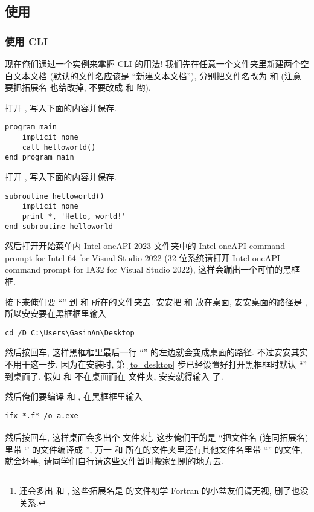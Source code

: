 \subsection{使用}\label{use_ifx}

\subsubsection{使用 CLI}

现在俺们通过一个实例来掌握 CLI 的用法! 我们先在任意一个文件夹里新建两个空白文本文档 (默认的文件名应该是 ``\textsf{新建}\ttt{\ }\textsf{文本文档}''), 分别把文件名改为  和  (注意要把拓展名  也给改掉, 不要改成  和  哟).

打开 , 写入下面的内容并保存.
\begin{lstlisting}
program main
    implicit none
    call helloworld()
end program main
\end{lstlisting}

打开 , 写入下面的内容并保存.
\begin{lstlisting}
subroutine helloworld()
    implicit none
    print *, 'Hello, world!'
end subroutine helloworld
\end{lstlisting}

然后打开开始菜单内 Intel oneAPI 2023 文件夹中的 Intel oneAPI command prompt for Intel 64 for Visual Studio 2022 (32 位系统请打开 Intel oneAPI command prompt for IA32 for Visual Studio 2022), 这样会蹦出一个可怕的黑框框.

接下来俺们要 ``'' 到  和  所在的文件夹去. 安安把  和  放在桌面, 安安桌面的路径是 , 所以安安要在黑框框里输入
\begin{verbatim}
cd /D C:\Users\GasinAn\Desktop
\end{verbatim}
然后按回车, 这样黑框框里最后一行 ``\ttt{>}'' 的左边就会变成桌面的路径. 不过安安其实不用干这一步, 因为在安装时, 第 \ref{to_desktop} 步已经设置好打开黑框框时默认 ``'' 到桌面了. 假如  和  不在桌面而在  文件夹, 安安就得输入  了.

然后俺们要编译  和 , 在黑框框里输入
\begin{verbatim}
ifx *.f* /o a.exe
\end{verbatim}
然后按回车, 这样桌面会多出个  文件来\footnote{还会多出  和 , 这些拓展名是  的文件初学 Fortran 的小盆友们请无视, 删了也没关系.}. 这步俺们干的是 ``把文件名 (连同拓展名) 里带 `' 的文件编译成 '', 万一  和  所在的文件夹里还有其他文件名里带 ``'' 的文件, 就会坏事, 请同学们自行请这些文件暂时搬家到别的地方去.

